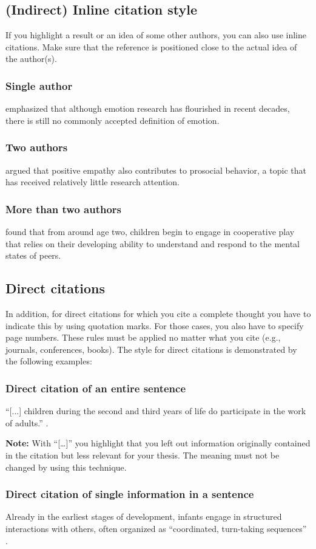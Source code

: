 \subsection{(Indirect) Inline citation style}
If you highlight a result or an idea of some other authors, you can also use inline citations. Make sure that the reference is positioned close to the actual idea of the author(s).

\subsubsection{Single author}
\textcite{izard_many_2010} emphasized that although emotion research has flourished in recent decades, there is still no commonly accepted definition of emotion.

\subsubsection{Two authors}
\textcite{telle_positive_2016} argued that positive empathy also contributes to prosocial behavior, a topic that has received relatively little research attention.

\subsubsection{More than two authors}
\textcite{brownell_peers_2002} found that from around age two, children begin to engage in cooperative play that relies on their developing ability to understand and respond to the mental states of peers.

\subsection{Direct citations}
In addition, for direct citations for which you cite a complete thought you have to indicate this by using quotation marks. For those cases, you also have to specify page numbers. These rules must be applied no matter what you cite (e.g., journals, conferences, books). The style for direct citations is demonstrated by the following examples:

\subsubsection{Direct citation of an entire sentence}
\enquote{[...] children during the second and third years of life do participate in the work of adults.} \autocite[p.~114]{rheingold_little_1982}.

\textbf{Note:} With \enquote{[…]} you highlight that you left out information originally contained in the citation but less relevant for your thesis. The meaning must not be changed by using this technique.

\subsubsection{Direct citation of single information in a sentence}
Already in the earliest stages of development, infants engage in structured interactions with others, often organized as \enquote{coordinated, turn-taking sequences} \autocite[p.~640]{warneken_cooperative_2006}.
